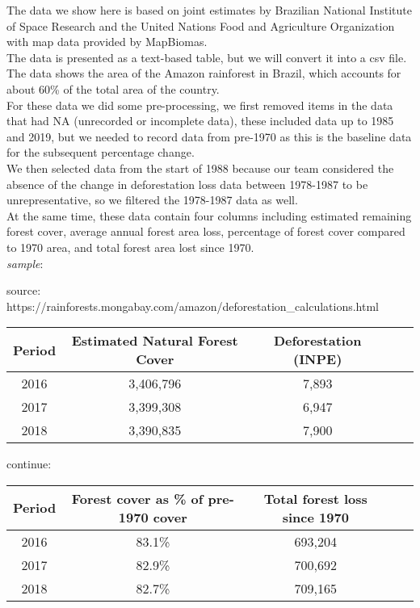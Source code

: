 \documentclass[12pt]{article}
\begin{document}
\begin{enumerate}
\begin{text}
The data we show here is based on joint estimates by Brazilian National Institute of Space Research and the United Nations Food and Agriculture Organization with map data provided by MapBiomas.\\
    The data is presented as a text-based table, but we will convert it into a csv file. The data shows the area of the Amazon rainforest in Brazil, which accounts for about 60\% of the total area of the country.\\
    For these data we did some pre-processing, we first removed items in the data that had NA (unrecorded or incomplete data), these included data up to 1985 and 2019, but we needed to record data from pre-1970 as this is the baseline data for the subsequent percentage change.\\
    We then selected data from the start of 1988 because our team considered the absence of the change in deforestation loss data between 1978-1987 to be unrepresentative, so we filtered the 1978-1987 data as well.\\
    At the same time, these data contain four columns including estimated remaining forest cover, average annual forest area loss, percentage of forest cover compared to 1970 area, and total forest area lost since 1970.\\


    \emph{sample}:

    source: https://rainforests.mongabay.com/amazon/deforestation\_calculations.html



    \begin{tabular}{ |c|c|c|c|c| }
    \hline
    Period &	Estimated Natural Forest Cover &	Deforestation (INPE) \\
      \hline
      2016 & 3,406,796  & 7,893 \\
      \hline
      2017 & 3,399,308  & 6,947  \\
      \hline
      2018 & 3,390,835  & 7,900   \\
      \hline
    \end{tabular}

    continue:

    \begin{tabular}{ |c|c|c|c|c| }
    \hline
    Period & Forest cover as \% of pre-1970 cover & Total forest loss since 1970  \\
      \hline
      2016 &  	83.1\% & 	693,204  \\
      \hline
      2017 & 82.9\% &	700,692  \\
      \hline
      2018 &  82.7\% &	709,165  \\
      \hline
    \end{tabular}



\end{text}
\end{enumerate}
\end{document}
